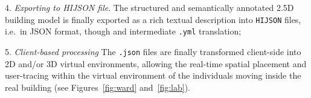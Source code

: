 4. \textit{Exporting to HIJSON file}.
The  structured and semantically annotated 2.5D building model is finally  exported as a rich textual description into \texttt{HIJSON} files, i.e.~in JSON format, though and intermediate \texttt{.yml} translation;

5. \textit{Client-based processing}
  The \texttt{.json} files are finally transformed client-side into 
  2D and/or 3D virtual environments, allowing the real-time spatial placement and
  user-tracing within the virtual environment of the individuals moving
  inside the real building (see Figures~\ref{fig:ward} and~\ref{fig:lab}).

